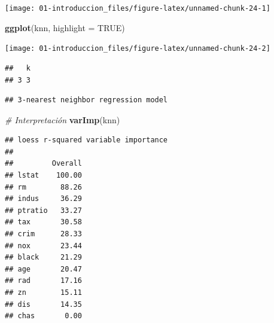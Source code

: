 \documentclass[]{book}
\newenvironment{Shaded}{\begin{snugshade}}{\end{snugshade}}
\newcommand{\KeywordTok}[1]{\textcolor[rgb]{0.13,0.29,0.53}{\textbf{#1}}}
\newcommand{\DataTypeTok}[1]{\textcolor[rgb]{0.13,0.29,0.53}{#1}}
\newcommand{\CommentTok}[1]{\textcolor[rgb]{0.56,0.35,0.01}{\textit{#1}}}
\newcommand{\OtherTok}[1]{\textcolor[rgb]{0.56,0.35,0.01}{#1}}
\newcommand{\OperatorTok}[1]{\textcolor[rgb]{0.81,0.36,0.00}{\textbf{#1}}}
\newcommand{\NormalTok}[1]{#1}
\theoremstyle{break}
\theoremstyle{definition}
\theoremstyle{definition}
\theoremstyle{definition}
\theoremstyle{remark}
\begin{document}
\begin{center}\texttt{[image: 01-introduccion\_files/figure-latex/unnamed-chunk-24-1]} \end{center}

\begin{Shaded}
\begin{Highlighting}[]
\KeywordTok{ggplot}\NormalTok{(knn, }\DataTypeTok{highlight =} \OtherTok{TRUE}\NormalTok{)}
\end{Highlighting}
\end{Shaded}

\begin{center}\texttt{[image: 01-introduccion\_files/figure-latex/unnamed-chunk-24-2]} \end{center}

\begin{Shaded}
\end{Shaded}

\begin{verbatim}
##   k
## 3 3
\end{verbatim}

\begin{Shaded}
\end{Shaded}

\begin{verbatim}
## 3-nearest neighbor regression model
\end{verbatim}

\begin{Shaded}
\begin{Highlighting}[]
\CommentTok{# Interpretación}
\KeywordTok{varImp}\NormalTok{(knn)}
\end{Highlighting}
\end{Shaded}

\begin{verbatim}
## loess r-squared variable importance
## 
##         Overall
## lstat    100.00
## rm        88.26
## indus     36.29
## ptratio   33.27
## tax       30.58
## crim      28.33
## nox       23.44
## black     21.29
## age       20.47
## rad       17.16
## zn        15.11
## dis       14.35
## chas       0.00
\end{verbatim}
\end{document}
